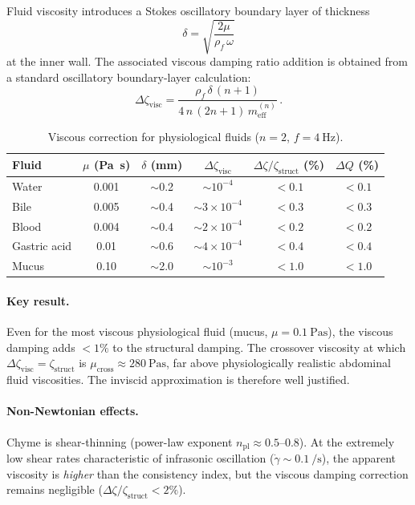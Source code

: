 \documentclass[12pt]{article}
\begin{document}
Fluid viscosity introduces a Stokes oscillatory boundary layer of thickness
\begin{equation}
  \delta = \sqrt{\frac{2\mu}{\rho_{f}\,\omega}}
  \tag{S21}
\end{equation}
at the inner wall.  The associated viscous damping ratio addition is obtained
from a standard oscillatory boundary-layer calculation:
\begin{equation}
  \Delta\zeta_{\mathrm{visc}} = \frac{\rho_{f}\,\delta\,(n+1)}{4\,n\,(2n+1)\,m_{\mathrm{eff}}^{(n)}} \,.
  \tag{S22}
\end{equation}

\begin{table}[htbp]
\centering
\caption{Viscous correction for physiological fluids ($n=2$, $f=\SI{4}{\hertz}$).}
\label{tab:viscous}
\begin{tabular}{@{}lSSSSS@{}}
\toprule
{Fluid} & {$\mu$ (\si{\pascal\second})} & {$\delta$ (\si{\milli\metre})}
  & {$\Delta\zeta_{\mathrm{visc}}$} & {$\Delta\zeta/\zeta_{\mathrm{struct}}$ (\%)}
  & {$\Delta Q$ (\%)} \\
\midrule
Water         & 0.001 & {$\sim$0.2}  & {$\sim 10^{-4}$} & {$<0.1$}  & {$<0.1$} \\
Bile          & 0.005 & {$\sim$0.4}  & {$\sim 3\times10^{-4}$} & {$<0.3$} & {$<0.3$} \\
Blood         & 0.004 & {$\sim$0.4}  & {$\sim 2\times10^{-4}$} & {$<0.2$} & {$<0.2$} \\
Gastric acid  & 0.01  & {$\sim$0.6}  & {$\sim 4\times10^{-4}$} & {$<0.4$} & {$<0.4$} \\
Mucus         & 0.10  & {$\sim$2.0}  & {$\sim 10^{-3}$} & {$<1.0$}  & {$<1.0$} \\
\bottomrule
\end{tabular}
\end{table}

\paragraph{Key result.}
Even for the most viscous physiological fluid (mucus,
$\mu = \SI{0.1}{\pascal\second}$), the viscous damping adds
$<1\%$ to the structural damping.  The crossover viscosity at which
$\Delta\zeta_{\mathrm{visc}} = \zeta_{\mathrm{struct}}$ is
$\mu_{\mathrm{cross}} \approx \SI{280}{\pascal\second}$, far above
physiologically realistic abdominal fluid viscosities.  The inviscid
approximation is therefore well justified.

\paragraph{Non-Newtonian effects.}
Chyme is shear-thinning (power-law exponent $n_{\mathrm{pl}} \approx 0.5$--$0.8$).
At the extremely low shear rates characteristic of infrasonic oscillation
($\dot{\gamma} \sim \SI{0.1}{\per\second}$), the apparent viscosity is
\emph{higher} than the consistency index, but the viscous damping correction
remains negligible ($\Delta\zeta/\zeta_{\mathrm{struct}} < 2\%$).
\end{document}
